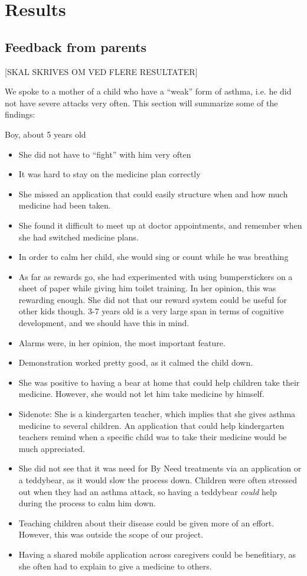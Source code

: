\chapter{Results}
\label{chp:results}


\section{Feedback from parents}

[SKAL SKRIVES OM VED FLERE RESULTATER]

We spoke to a mother of a child who have a ``weak'' form of asthma, i.e. he did not have severe attacks very often. This section will summarize some of the findings: 

Boy, about 5 years old
\begin{itemize}
  \item She did not have to ``fight'' with him very often
  \item It was hard to stay on the medicine plan correctly
  \item She missed an application that could easily structure when and how much medicine had been taken.
  \item She found it difficult to meet up at doctor appointments, and remember when she had switched medicine plans. 
  \item In order to calm her child, she would sing or count while he was breathing
  \item As far as rewards go, she had experimented with using bumperstickers on a sheet of paper while giving him toilet training. In her opinion, this was rewarding enough. She did not that our reward system could be useful for other kids though. 3-7 years old is a very large span in terms of cognitive development, and we should have this in mind. 
  \item Alarms were, in her opinion, the most important feature. 
  \item Demonstration worked pretty good, as it calmed the child down. 
  \item She was positive to having a bear at home that could help children take their medicine. However, she would not let him take medicine by himself. 
  \item Sidenote: She is a kindergarten teacher, which implies that she gives asthma medicine to several children. An application that could help kindergarten teachers remind when a specific child was to take their medicine would be much appreciated.
  \item She did not see that it was need for By Need treatments via an application or a teddybear, as it would slow the process down. Children were often stressed out when they had an asthma attack, so having a teddybear \emph{could} help during the process to calm him down. 
  \item Teaching children about their disease could be given more of an effort. However, this was outside the scope of our project. 
  \item Having a shared mobile application across caregivers could be benefitiary, as she often had to explain to give a medicine to others.  
\end{itemize} 




